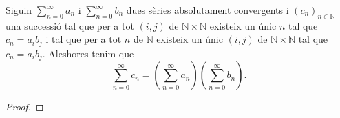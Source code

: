 \documentclass[../Apunts.tex]{subfiles}
\begin{document}
	\begin{theorem}
		\label{Teorema de Cauchy}\label{thm:Teorema de Cauchy}
		Siguin \(\sum_{n=0}^{\infty}a_{n}\) i \(\sum_{n=0}^{\infty}b_{n}\) dues sèries absolutament convergents i \((c_{n})_{n\in\mathbb{N}}\) una successió tal que per a tot \((i,j)\) de \(\mathbb{N}\times\mathbb{N}\) existeix un únic \(n\) tal que \(c_{n}=a_{i}b_{j}\) i tal que per a tot \(n\) de \(\mathbb{N}\) existeix un únic \((i,j)\) de \(\mathbb{N}\times\mathbb{N}\) tal que \(c_{n}=a_{i}b_{j}\). Aleshores tenim que
		\[\sum_{n=0}^{\infty}c_{n}=\left(\sum_{n=0}^{\infty}a_{n}\right)\left(\sum_{n=0}^{\infty}b_{n}\right).\]
		\begin{proof} %
		\begin{comment}
			Per la proposició \myref{prop:una sèrie absolutament convergent és convergent} tenim que les sèries \(\sum_{n=0}^{\infty}a_{n}\) i \(\sum_{n=0}^{\infty}b_{n}\) són convergents, i per tant tenim que la successió
			\[p_{N}=\left(\sum_{n=0}^{N}a_{n}\right)\left(\sum_{n=0}^{N}b_{n}\right)\]
			és convergent.
			
			Com que per hipòtesi les sèries \(\sum_{n=0}^{\infty}a_{n}\) i \(\sum_{n=0}^{\infty}b_{n}\) són absolutament convergents, per la definició de \myref{def:convergència absoluta d'una sèrie}, trobem que les sèries \(\sum_{n=0}^{\infty}\abs{a_{n}}\) i \(\sum_{n=0}^{\infty}\abs{b_{n}}\) són convergents, i per tant tenim que la successió
			\[p_{N}=\sum_{n=0}^{N}\abs{a_{n}}\sum_{n=0}^{N}\abs{b_{n}}\]
			és convergent.
			
			Per la definició de \myref{def:límit} trobem que per a tot \(\varepsilon>0\) existeix un natural \(n_{0}\) tal que per a tot \(N\geq n_{0}\) es satisfà
			\begin{equation}
				\label{thm:Teorema de Cauchy:eq1}
				\abs{\sum_{n=0}^{N}\abs{a_{n}}\sum_{n=0}^{N}\abs{b_{n}}-\sum_{n=0}^{\infty}\abs{a_{n}}\sum_{n=0}^{\infty}\abs{b_{n}}}\leq\frac{\varepsilon}{2},
			\end{equation}
			i per \eqref{thm:Teorema de Cauchy:eq1} tenim que per a tot \(N\geq n_{0}\) es satisfà
			\begin{equation}
				\label{thm:Teorema de Cauchy:eq3}
				\sum_{n=N}^{\infty}\abs{a_{n}}\sum_{n=N}^{\infty}\abs{b_{n}}\leq\frac{\varepsilon}{2}.
			\end{equation}
			
			
			
			Com que per hipòtesi les sèries \(\sum_{n=0}^{\infty}a_{n}\) i \(\sum_{n=0}^{\infty}b_{n}\) són absolutament convergents, per la proposició \myref{prop:una sèrie absolutament convergent és convergent} tenim que les sèries \(\sum_{n=0}^{\infty}a_{n}\) i \(\sum_{n=0}^{\infty}b_{n}\) són convergents, i per la definició de \myref{def:sèrie convergent} trobem que la successió
			\[p_{N}=\sum_{n=0}^{N}a_{n}\sum_{n=0}^{N}b_{n}\]
			és convergent.
			

\end{comment}
\end{proof}
\end{theorem}
\end{document}
